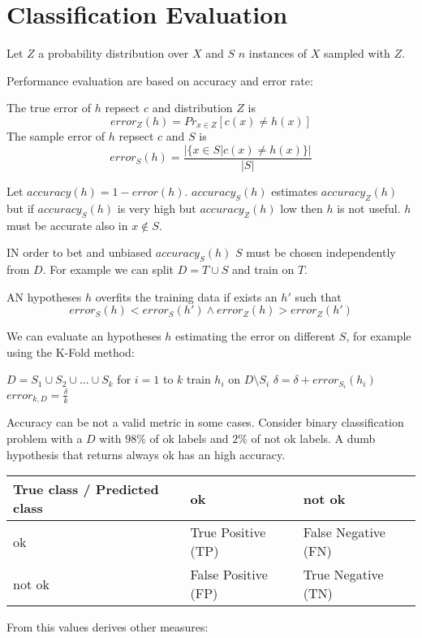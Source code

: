\section{Classification Evaluation}

Let $Z$ a probability distribution over $X$ and $S$ $n$ instances of $X$ sampled with $Z$.

Performance evaluation are based on accuracy and error rate:

The true error of $h$ repsect $c$ and distribution $Z$ is 
\[
error_Z(h) = Pr_{x \in Z}[c(x) \neq h(x)]
\]
The sample error of $h$ repsect $c$ and $S$ is
\[
error_S(h) = \frac{|\{x \in S | c(x) \neq h(x)\}|}{|S|}
\]

Let $accuracy(h) = 1 - error(h)$.
$accuracy_S(h)$ estimates $accuracy_Z(h)$ but if $accuracy_S(h)$ is very high but $accuracy_Z(h)$ low then $h$ is not useful. $h$ must be accurate also in $x \notin S$.

IN order to bet and unbiased $accuracy_S(h)$ $S$ must be chosen independently from $D$. For example we can split $D = T \cup S$ and train on $T$.

AN hypotheses $h$ overfits the training data if exists an $h'$ such that
\[
error_S(h) < error_S(h') \land error_Z(h) > error_Z(h')
\]

We can evaluate an hypotheses $h$ estimating the error on different $S$, for example using the K-Fold method:

\begin{pseudo}
$D = S_1 \cup S_2 \cup ... \cup S_k$
for $i = 1$ to $k$
    train $h_i$ on $D \setminus S_i$
    $\delta = \delta + error_{S_i}(h_i)$
$error_{k, D} = \frac{\delta}{k}$
\end{pseudo}

Accuracy can be not a valid metric in some cases. Consider binary classification problem with a $D$ with $98\%$ of ok labels and $2\%$ of not ok labels. A dumb hypothesis that returns always ok has an high accuracy.

\bigskip
\begin{tabular}{ | l | l | l | }
\hline
\textbf{True class / Predicted class} & ok & not ok \\ \hline
ok & True Positive (TP) & False Negative (FN) \\ \hline
not ok & False Positive (FP) & True Negative (TN) \\ \hline
\end{tabular}
\bigskip

From this values derives other measures:

